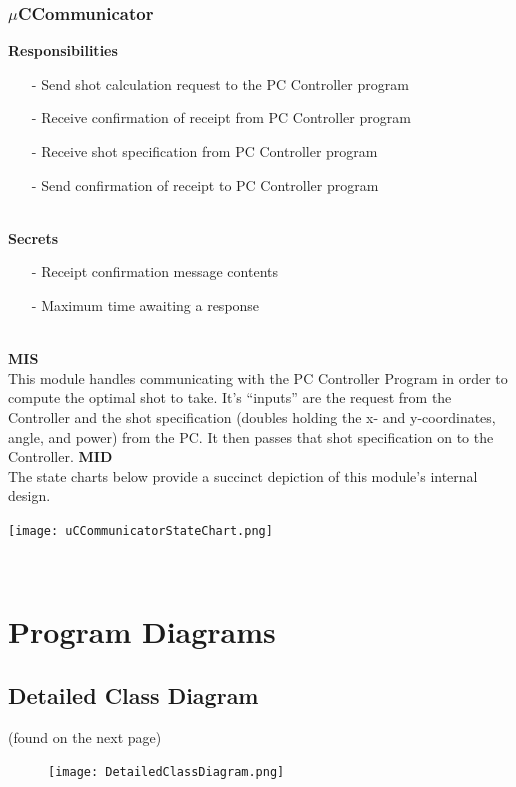 \documentclass[titlepage]{article}
\begin{document}
\subsubsection{$\mu$CCommunicator}
\textbf{Responsibilities}
\begin{itemize}
	\item[-] Send shot calculation request to the PC Controller program
	\item[-] Receive confirmation of receipt from PC Controller program
	\item[-] Receive shot specification from PC Controller program
	\item[-] Send confirmation of receipt to PC Controller program 
\end{itemize}~\\
\textbf{Secrets}
\begin{itemize}
	\item[-] Receipt confirmation message contents
	\item[-] Maximum time awaiting a response
\end{itemize}~\\
\textbf{MIS}\\[2mm]
This module handles communicating with the PC Controller Program in order to compute the optimal shot to take. It's ``inputs'' are the request from the Controller and the shot specification (doubles holding the x- and y-coordinates, angle, and power) from the PC. It then passes that shot specification on to the Controller.
\newpage
\textbf{MID}\\[2mm]
The state charts below provide a succinct depiction of this module's internal design.\\
\begin{center}
	\texttt{[image: uCCommunicatorStateChart.png]}
\label{fig:uCCommunicatorStateChart}
\end{center}~\\



\section{Program Diagrams}
\subsection{Detailed Class Diagram}
(found on the next page)
\begin{figure}
	\begin{center}
		\texttt{[image: DetailedClassDiagram.png]}
	\label{fig:detailedClassDiagram}
	\end{center}
\end{figure}
\newpage
\end{document}
